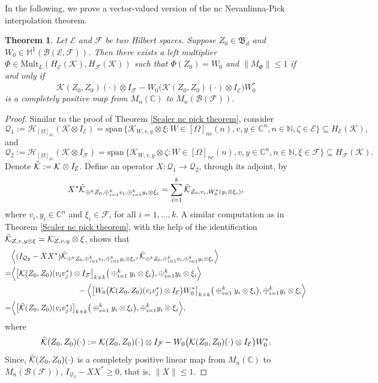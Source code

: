 \documentclass[12pt]{amsart}%
\newtheorem{theorem}{Theorem}[section]
\numberwithin{equation}{section}
\newcommand{\fB}{{\mathfrak{B}}}
\newcommand{\clb}{\mathcal{B}}
\newcommand{\cle}{\mathcal{E}}
\newcommand{\clf}{\mathcal{F}}
\newcommand{\clh}{\mathcal{H}}
\newcommand{\clk}{\mathcal{K}}
\newcommand{\clq}{\mathcal{Q}}
\newcommand{\C}{\mathbb{C}}
\begin{document}
In the following, we prove a vector-valued version of the nc Nevanlinna-Pick interpolation theorem.
\begin{theorem}\label{vector-valued Pick}
 Let $\cle$ and $\clf$ be two Hilbert spaces. Suppose $Z_0\in \fB_d$ and $W_0\in \mathbb{M}^1(\clb(\cle, \clf))$. Then there exists a left multiplier $\Phi\in \text{Mult}_L(H_\cle(\clk), H_\clf(\clk))$ such that $\Phi(Z_0)=W_0$ and $\|M_\Phi\|\leq 1$ if and only if
\[ \clk(Z_0, Z_0)(\cdot)\otimes I_\clf -W_0 \big(\clk(Z_0, Z_0)(\cdot)\otimes I_{\cle}\big) W_0^*\]
is a completely positive map from $M_n(\C)$ to $M_n(\clb(\clf))$.
\end{theorem}
\begin{proof}  Similar to the proof of Theorem \ref{Scaler nc pick theorem}, consider
\[\clq_1:=\clh_{[\Omega]_{nc}}(\clk\otimes I_{\cle})=\overline{\text{span}}\,\{ \clk_{W, v, y}\otimes \xi: W\in [\Omega]_{nc}(n), v, y\in \C^n, n\in \mathbb{N},\zeta\in\cle\}\subseteq H_\cle(\clk),\]
and 
\[\clq_2:=\clh_{[\Omega]_{nc}}(\clk\otimes I_{\clf})=\overline{\text{span}}\,\{ \clk_{W, v, y}\otimes \zeta: W\in [\Omega]_{nc}(n), v, y\in \C^n, n\in \mathbb{N},\xi\in\clf\}\subseteq H_\clf(\clk).\]
Denote $\Tilde{\clk}:=\clk\otimes I_{\cle}$. Define an operator $X:\clq_1\to\clq_2$, through its adjoint, by 
\[
X^*\Tilde{\clk}_{\oplus^k Z_0, \oplus_{i=1}^k v_i, \oplus_{i=1}^k y_i\otimes\xi_i}=\sum_{i=1}^k\Tilde{\clk}_{Z_0, v_i, W^*_0 (y_i\otimes\xi_i)},
\]
where $v_i, y_i\in \C^n$ and $\xi_i\in\clf$, for all $i=1, \ldots, k$. A similar computation as in Theorem \ref{Scaler nc pick theorem}, with the help of the identification $\Tilde{\clk}_{Z,v,y\otimes\xi}=\clk_{Z,v,y}\otimes\xi$, shows that
\begingroup
 \allowdisplaybreaks
\begin{align*}
&\Big\langle (I_{\clq_2}-X X^*) \Tilde{\clk}_{\oplus^k Z_0, \oplus_{i=1}^k v_i, \oplus_{i=1}^k y_i\otimes \xi_i},  \Tilde{\clk}_{\oplus^k Z_0, \oplus_{i=1}^k v_i, \oplus_{i=1}^k y_i\otimes\xi_i}\Big\rangle\\
=& \Big\langle \big[\clk(Z_0, Z_0)(v_i v^*_j)\otimes I_\clf\big]_{k\times k}  \big(\oplus_{i=1}^k y_i\otimes\xi_i\big),  \oplus_{i=1}^k y_i\otimes\xi_i\Big\rangle
\\&\hspace{3cm}- \Big\langle \big[W_0\big(\clk(Z_0, Z_0)(v_i v^*_j)\otimes I_{\cle}\big)W^*_0\big]_{k\times k}  \big(\oplus_{i=1}^k y_i\otimes\xi_i\big),  \oplus_{i=1}^k y_i\otimes\xi_i\Big\rangle\\
=& \Big\langle\big[\tilde{\clk}(Z_0, Z_0)(v_i v^*_j)\big]_{k\times k}  \big(\oplus_{i=1}^k y_i\otimes\xi_i\big),  \oplus_{i=1}^k y_i\otimes\xi_i\Big\rangle,
\end{align*}
\endgroup
where
\[
\Tilde{\clk}(Z_0,Z_0)(\cdot):=\clk(Z_0, Z_0)(\cdot)\otimes I_\clf -W_0 \big(\clk(Z_0, Z_0)(\cdot)\otimes I_{\cle}\big) W_0^*.
\]
Since, $\Tilde{\clk}(Z_0,Z_0)(\cdot)$ is a completely positive linear map from $M_n(\C)$ to $M_n(\clb(\clf))$, $I_{\clq_2}-X X^*\geq 0$, that is, $\|X\|\leq 1$. 


\end{proof}
\end{document}
